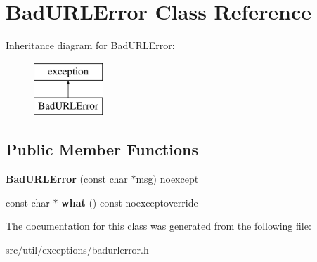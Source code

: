\hypertarget{classBadURLError}{}\section{Bad\+U\+R\+L\+Error Class Reference}
\label{classBadURLError}
Inheritance diagram for Bad\+U\+R\+L\+Error\+:\begin{figure}[H]
\begin{center}
\leavevmode
\includegraphics[height=2.000000cm]{classBadURLError}
\end{center}
\end{figure}
\subsection*{Public Member Functions}
\begin{DoxyCompactItemize}
\item 
{\bfseries Bad\+U\+R\+L\+Error} (const char $\ast$msg) noexcept\hypertarget{classBadURLError_a4811b976c8426c31a80d916a9ef93088}{}\label{classBadURLError_a4811b976c8426c31a80d916a9ef93088}

\item 
const char $\ast$ {\bfseries what} () const noexceptoverride\hypertarget{classBadURLError_a66ed30376b91a85e99a1201ce63c3524}{}\label{classBadURLError_a66ed30376b91a85e99a1201ce63c3524}

\end{DoxyCompactItemize}


The documentation for this class was generated from the following file\+:\begin{DoxyCompactItemize}
\item 
src/util/exceptions/badurlerror.\+h\end{DoxyCompactItemize}
